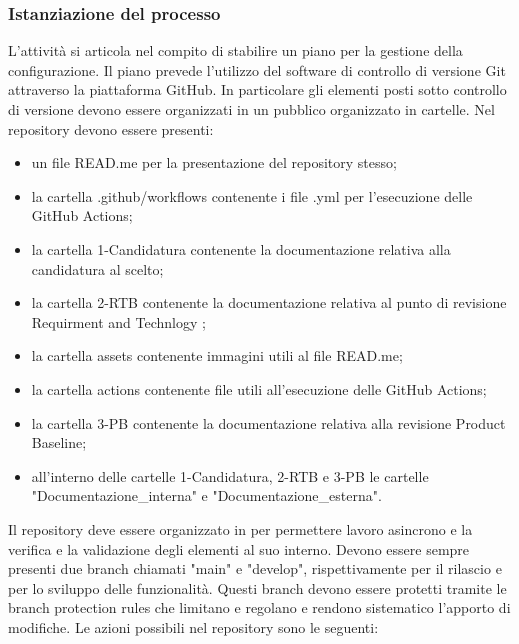 \subsubsection{Istanziazione del processo}
L'attività si articola nel compito di stabilire un piano per la gestione della configurazione. Il piano prevede l'utilizzo del software di controllo di versione Git attraverso la piattaforma GitHub. In particolare gli elementi posti sotto controllo di versione devono essere organizzati in un  pubblico organizzato in cartelle. Nel repository devono essere presenti: 
\begin{itemize}
    \item un file READ.me per la presentazione del repository stesso;
    \item la cartella .github/workflows contenente i file .yml per l'esecuzione delle GitHub Actions;
    \item la cartella 1-Candidatura contenente la documentazione relativa alla candidatura al  scelto;
    \item la cartella 2-RTB contenente la documentazione relativa al punto di revisione Requirment and Technlogy ;
    \item la cartella assets contenente immagini utili al file READ.me;
    \item la cartella actions contenente file utili all'esecuzione delle GitHub Actions;
    \item la cartella 3-PB contenente la documentazione relativa alla revisione Product Baseline;
    \item all'interno delle cartelle 1-Candidatura, 2-RTB e 3-PB le cartelle "Documentazione\_interna" e "Documentazione\_esterna".
\end{itemize}
Il repository deve essere organizzato in  per permettere lavoro asincrono e la verifica e la validazione degli elementi al suo interno. Devono essere sempre presenti due branch chiamati "main" e "develop", rispettivamente per il rilascio e per lo sviluppo delle funzionalità. Questi branch devono essere protetti tramite le branch protection rules che limitano e regolano e rendono sistematico l'apporto di modifiche.
Le azioni possibili nel repository sono le seguenti:
